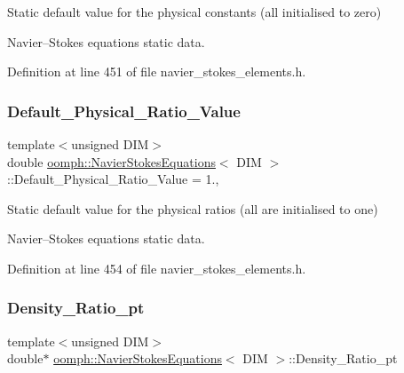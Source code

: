 Static default value for the physical constants (all initialised to zero) 

Navier--Stokes equations static data. 

Definition at line 451 of file navier\+\_\+stokes\+\_\+elements.\+h.

\mbox{\label{classoomph_1_1NavierStokesEquations_ab9a614a9885d8fbdcc6f07e3a5ffa9ee}} 
\subsubsection{\texorpdfstring{Default\+\_\+\+Physical\+\_\+\+Ratio\+\_\+\+Value}{Default\_Physical\_Ratio\_Value}}
{\footnotesize\ttfamily template$<$unsigned D\+IM$>$ \\
double \hyperlink{classoomph_1_1NavierStokesEquations}{oomph\+::\+Navier\+Stokes\+Equations}$<$ D\+IM $>$\+::Default\+\_\+\+Physical\+\_\+\+Ratio\+\_\+\+Value = 1.\hspace{0.3cm}{\ttfamily [static]}, {\ttfamily [private]}}



Static default value for the physical ratios (all are initialised to one) 

Navier--Stokes equations static data. 

Definition at line 454 of file navier\+\_\+stokes\+\_\+elements.\+h.

\mbox{\label{classoomph_1_1NavierStokesEquations_acc13af61f61d5cb36312ccabcdb512a3}} 
\subsubsection{\texorpdfstring{Density\+\_\+\+Ratio\+\_\+pt}{Density\_Ratio\_pt}}
{\footnotesize\ttfamily template$<$unsigned D\+IM$>$ \\
double$\ast$ \hyperlink{classoomph_1_1NavierStokesEquations}{oomph\+::\+Navier\+Stokes\+Equations}$<$ D\+IM $>$\+::Density\+\_\+\+Ratio\+\_\+pt\hspace{0.3cm}{\ttfamily [protected]}}



